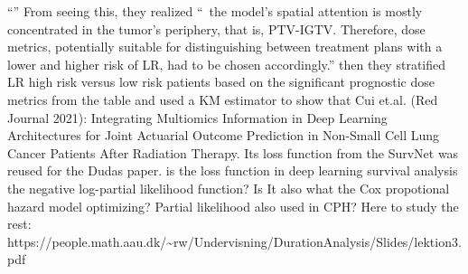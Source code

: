 \documentclass{article}%
\begin{document}
%
“”%
\newline%
\newline%
%
%
\newline%
\newline%
%
From seeing this, they realized “~the model's spatial attention is mostly concentrated in the tumor's periphery, that is, PTV{-}IGTV. Therefore, dose metrics, potentially suitable for distinguishing between treatment plans with a lower and higher risk of LR, had to be chosen accordingly.”%
\newline%
\newline%
%
%
\newline%
\newline%
%
then they stratified LR high risk versus low risk patients based on the significant prognostic dose metrics from the table and used a KM estimator to show that%
\newline%
\newline%
%
%
\newline%
\newline%
%
%
\newline%
\newline%
%
Cui et.al. (Red Journal 2021): Integrating Multiomics Information in Deep Learning Architectures for Joint Actuarial Outcome Prediction in Non{-}Small Cell Lung Cancer Patients After Radiation Therapy. Its loss function from the SurvNet was reused for the Dudas paper. %
\newline%
\newline%
%
is the loss function in deep learning survival analysis the negative log{-}partial likelihood function? %
\newline%
\newline%
%
Is It also what the Cox propotional hazard model optimizing? %
\newline%
\newline%
%
Partial likelihood also used in CPH?%
\newline%
\newline%
%
%
\newline%
\newline%
%
%
\newline%
\newline%
%
%
\newline%
\newline%
%
%
\newline%
\newline%
%
%
\newline%
\newline%
%
Here to study the rest: https://people.math.aau.dk/\textasciitilde{}rw/Undervisning/DurationAnalysis/Slides/lektion3.pdf %
\newline%
\newline%
%
%
\newline%
\newline%
%
\end{document}
